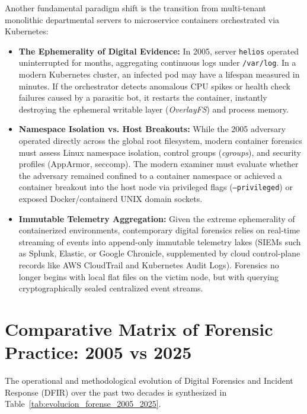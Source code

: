 Another fundamental paradigm shift is the transition from multi-tenant monolithic departmental servers to microservice containers orchestrated via Kubernetes:
\begin{itemize}
    \item \textbf{The Ephemerality of Digital Evidence:} In 2005, server \texttt{helios} operated uninterrupted for months, aggregating continuous logs under \texttt{/var/log}. In a modern Kubernetes cluster, an infected pod may have a lifespan measured in minutes. If the orchestrator detects anomalous CPU spikes or health check failures caused by a parasitic bot, it restarts the container, instantly destroying the ephemeral writable layer (\textit{OverlayFS}) and process memory.
    \item \textbf{Namespace Isolation vs. Host Breakouts:} While the 2005 adversary operated directly across the global root filesystem, modern container forensics must assess Linux namespace isolation, control groups (\textit{cgroups}), and security profiles (AppArmor, seccomp). The modern examiner must evaluate whether the adversary remained confined to a container namespace or achieved a container breakout into the host node via privileged flags (\texttt{--privileged}) or exposed Docker/containerd UNIX domain sockets.
    \item \textbf{Immutable Telemetry Aggregation:} Given the extreme ephemerality of containerized environments, contemporary digital forensics relies on real-time streaming of events into append-only immutable telemetry lakes (SIEMs such as Splunk, Elastic, or Google Chronicle, supplemented by cloud control-plane records like AWS CloudTrail and Kubernetes Audit Logs). Forensics no longer begins with local flat files on the victim node, but with querying cryptographically sealed centralized event streams.
\end{itemize}

\section{Comparative Matrix of Forensic Practice: 2005 vs 2025}

The operational and methodological evolution of Digital Forensics and Incident Response (DFIR) over the past two decades is synthesized in Table~\ref{tab:evolucion_forense_2005_2025}.

